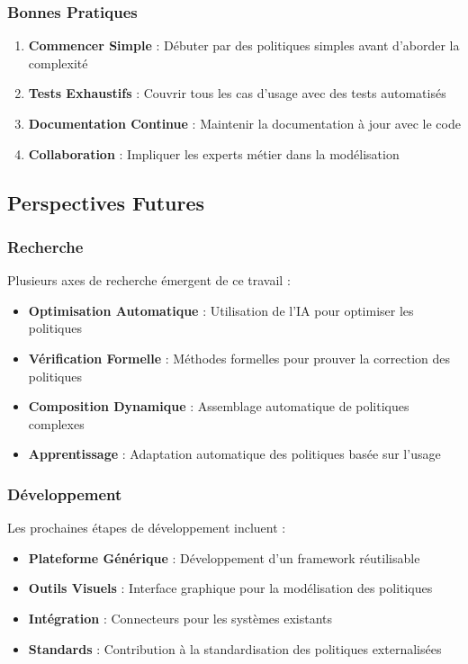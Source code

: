 \documentclass[12pt,a4paper]{article}
\begin{document}
    \subsubsection{Bonnes Pratiques}

    \begin{enumerate}
        \item \textbf{Commencer Simple} : Débuter par des politiques simples avant d'aborder la complexité
        \item \textbf{Tests Exhaustifs} : Couvrir tous les cas d'usage avec des tests automatisés
        \item \textbf{Documentation Continue} : Maintenir la documentation à jour avec le code
        \item \textbf{Collaboration} : Impliquer les experts métier dans la modélisation
    \end{enumerate}

    \subsection{Perspectives Futures}

    \subsubsection{Recherche}

    Plusieurs axes de recherche émergent de ce travail :

    \begin{itemize}
        \item \textbf{Optimisation Automatique} : Utilisation de l'IA pour optimiser les politiques
        \item \textbf{Vérification Formelle} : Méthodes formelles pour prouver la correction des politiques
        \item \textbf{Composition Dynamique} : Assemblage automatique de politiques complexes
        \item \textbf{Apprentissage} : Adaptation automatique des politiques basée sur l'usage
    \end{itemize}

    \subsubsection{Développement}

    Les prochaines étapes de développement incluent :

    \begin{itemize}
        \item \textbf{Plateforme Générique} : Développement d'un framework réutilisable
        \item \textbf{Outils Visuels} : Interface graphique pour la modélisation des politiques
        \item \textbf{Intégration} : Connecteurs pour les systèmes existants
        \item \textbf{Standards} : Contribution à la standardisation des politiques externalisées
    \end{itemize}
\end{document}
